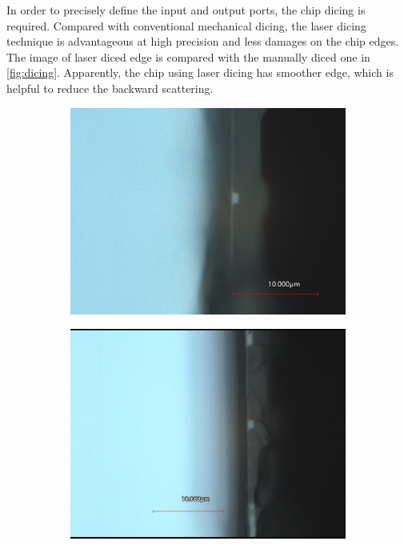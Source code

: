In order to precisely define the input and output ports, the chip dicing is required.
Compared with conventional mechanical dicing,  the laser dicing technique is advantageous at high precision and less damages on the chip edges. The image of laser diced edge is compared with the manually diced one in \autoref{fig:dicing}. Apparently, the chip using laser dicing has smoother edge, which is helpful to reduce the backward scattering.

\begin{figure}
    \centering
	\begin{subfigure}[b]{0.45\textwidth}
		\includegraphics[width=\textwidth]{imgs/jpg/laser}
	\end{subfigure}
	\begin{subfigure}[b]{0.45\textwidth}
		\includegraphics[width=\textwidth]{imgs/jpg/manual_cleav}
	\end{subfigure}
    \label{fig:dicing}
\end{figure}

